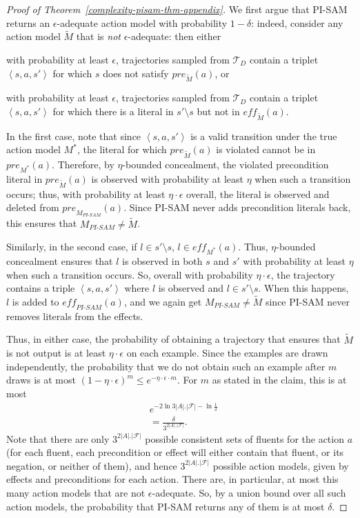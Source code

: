 \documentclass{article}
\theoremstyle{plain}
\theoremstyle{definition}
\theoremstyle{remark}
\theoremstyle{observation}
\newcommand{\tuple}[1]{\ensuremath{\left \langle #1 \right \rangle }}
\newcommand{\pre}{\textit{pre}}
\newcommand{\eff}{\textit{eff}}
\newcommand{\pisam}{\textit{PI-SAM}\xspace}
\begin{document}
\begin{proof}[Proof of Theorem~\ref{complexity-pisam-thm-appendix}]
We first argue that PI-SAM returns an $\epsilon$-adequate action model with probability $1-\delta$: indeed, consider any action model $\tilde{M}$ that is {\em not} $\epsilon$-adequate: then either
\begin{compactenum}
\item with probability at least $\epsilon$, trajectories sampled from $\mathcal{T}_D$ contain a triplet $\tuple{s,a,s'}$ for which $s$ does not satisfy $\pre_{\tilde{M}}(a)$, or
\item with probability at least $\epsilon$, trajectories sampled from $\mathcal{T}_D$ contain a triplet $\tuple{s,a,s'}$ for which there is a literal in $s'\setminus s$ but not in $\eff_{\tilde{M}}(a)$.
\end{compactenum}
In the first case, note that since $\tuple{s,a,s'}$ is a valid transition under the true action model $M^*$, the literal for which $\pre_{\tilde{M}}(a)$ is violated cannot be in $\pre_{M^*}(a)$. Therefore, by $\eta$-bounded concealment, the violated precondition literal in $\pre_{\tilde{M}}(a)$ is observed with probability at least $\eta$ when such a transition occurs; thus, with probability at least $\eta\cdot\epsilon$ overall, the literal is observed and deleted from $\pre_{M_{\pisam}}(a)$. Since PI-SAM never adds precondition literals back, this ensures that $M_{\pisam}\neq \tilde{M}$.

Similarly, in the second case, if $l\in s'\setminus s$, $l\in\eff_{M^*}(a)$. Thus, $\eta$-bounded concealment ensures that $l$ is observed in both $s$ and $s'$ with probability at least $\eta$ when such a transition occurs. So, overall with probability $\eta\cdot\epsilon$, the trajectory contains a triple $\tuple{s,a,s'}$ where $l$ is observed and $l\in s'\setminus s$. When this happens, $l$ is added to $\eff_{\pisam}(a)$, and we again get $M_\pisam\neq \tilde{M}$ since PI-SAM never removes literals from the effects.

Thus, in either case, the probability of obtaining a trajectory that ensures that $\tilde{M}$ is not output is at least $\eta\cdot\epsilon$ on each example. Since the examples are drawn independently, the probability that we do not obtain such an example after $m$ draws is at most $(1-\eta\cdot\epsilon)^m\leq e^{-\eta\cdot\epsilon\cdot m}$. For $m$ as stated in the claim, this is at most
\begin{align*}
&e^{-2\ln 3 |A|.{|\mathcal{F}|} - \ln \frac{1}{\delta}}\\
&= \frac{\delta}{3^{2|A|.{|\mathcal{F}|}}}.
\end{align*}
Note that there are only $3^{2 |A|.{|\mathcal{F}|}}$ possible consistent sets of fluents for the action $a$ (for each fluent, each precondition or effect will either contain that fluent, or its negation, or neither of them), and hence $3^{2|A|.{|\mathcal{F}|}}$ possible action models, given by effects and preconditions for each action. There are, in particular, at most this many action models that are not $\epsilon$-adequate. So, by a union bound over all such action models, the probability that PI-SAM returns any of them is at most $\delta$.


\end{proof}
\end{document}
